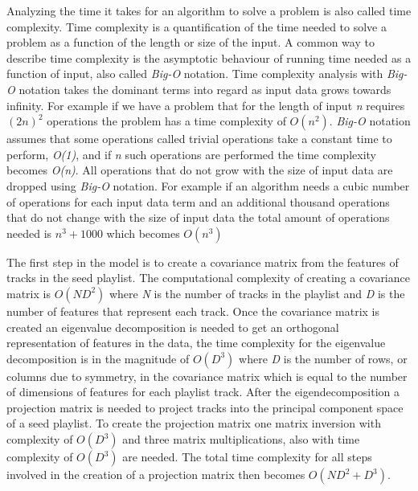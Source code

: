 \documentclass[a4paper,11pt]{kth-mag}
\begin{document}
Analyzing the time it takes for an algorithm to solve a problem is also called time complexity. Time complexity is a quantification of the time needed to solve a problem as a function of the length or size of the input. A common way to describe time complexity is the asymptotic behaviour of running time needed as a function of input, also called \textit{Big-O} notation. Time complexity analysis with \textit{Big-O} notation takes the dominant terms into regard as input data grows towards infinity. For example if we have a problem that for the length of input \textit{n} requires $(2n)^2$ operations the problem has a time complexity of $O(n^2)$. \textit{Big-O} notation assumes that some operations called trivial operations take a constant time to perform, \textit{O(1)}, and if \textit{n} such operations are performed the time complexity becomes \textit{O(n)}. All operations that do not grow with the size of input data are dropped using \textit{Big-O} notation. For example if an algorithm needs a cubic number of operations for each input data term and an additional thousand operations that do not change with the size of input data the total amount of operations needed is $n^3 + 1000$ which becomes $O(n^3)$

The first step in the model is to create a covariance matrix from the features of tracks in the seed playlist. The computational complexity of creating a covariance matrix is $O(ND^2)$ where \textit{N} is the number of tracks in the playlist and \textit{D} is the number of features that represent each track\cite{kwatra2010fast}. Once the covariance matrix is created an eigenvalue decomposition is needed to get an orthogonal representation of features in the data, the time complexity for the eigenvalue decomposition is in the magnitude of $O(D^3)$ where \textit{D} is the number of rows, or columns due to symmetry, in the covariance matrix which is equal to the number of dimensions of features for each playlist track\cite{pan1999complexity}. After the eigendecomposition a projection matrix is needed to project tracks into the principal component space of a seed playlist. To create the projection matrix one matrix inversion with complexity of $O(D^3)$ and three matrix multiplications, also with time complexity of $O(D^3)$ are needed. The total time complexity for all steps involved in the creation of a projection matrix then becomes $O(ND^2 + D^3)$.
\end{document}
